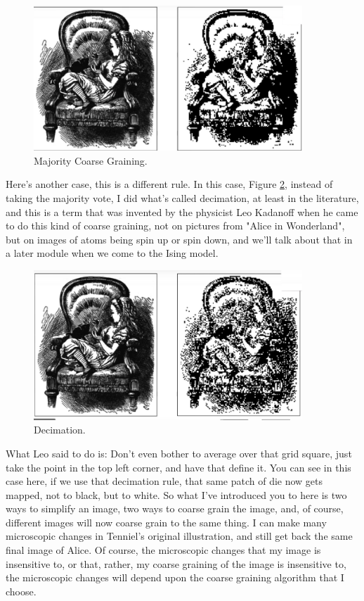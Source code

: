 \documentclass[]{article}
\begin{document}
\begin{figure}[H]
	\caption{Majority Coarse Graining.}\label{fig:alice:result:coarse:graining}
	\includegraphics[width=0.9\textwidth]{Alice4}
\end{figure}

Here's another case, this is a different rule.
In this case, Figure \ref{fig:alice:result:decimation}, instead of taking the majority vote, I did what's called decimation,
at least in the literature, and this is a term that was invented
by the physicist Leo Kadanoff\cite{kadanoff2000statistical}
when he came to do this kind of coarse graining, not on pictures
from "Alice in Wonderland", but on images of atoms
being spin up or spin down, and we'll talk about that
in a later module when we come to the Ising model.
\begin{figure}[H]
	\caption{Decimation.}\label{fig:alice:result:decimation}
	\includegraphics[width=0.9\textwidth]{Alice5}
\end{figure}

What Leo said to do is: Don't even bother to average over that grid square, just take the point in the top left corner,
and have that define it. You can see in this case here, if we use that decimation rule,
that same patch of die now gets mapped,
not to black, but to white.
So what I've introduced you to here
is two ways to simplify an image,
two ways to coarse grain the image,
and, of course, different images
will now coarse grain to the same thing.
I can make many microscopic changes
in Tenniel's original illustration,
and still get back
the same final image of Alice.
Of course, the microscopic changes
that my image is insensitive to,
or that, rather, my coarse graining
of the image is insensitive to,
the microscopic changes will depend upon
the coarse graining algorithm
that I choose.
\end{document}
